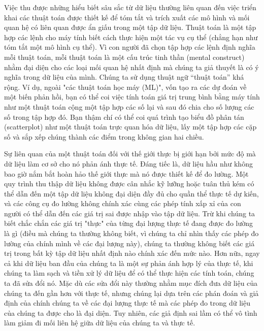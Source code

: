 Việc thu được những hiểu biết sâu sắc từ dữ liệu thường liên quan đến việc triển khai các thuật toán được thiết kế để tóm tắt và trích xuất các mô hình và mối quan hệ có liên quan được ẩn giấu trong một tập dữ liệu. Thuật toán là một tập hợp các lệnh cho máy tính biết cách thực hiện một tác vụ cụ thể (chẳng hạn như tóm tắt một mô hình cụ thể). Vì con người đã chọn tập hợp các lệnh định nghĩa mỗi thuật toán, mỗi thuật toán là một cấu trúc tinh thần (mental construct) nhằm đại diện cho các loại mối quan hệ nhất định mà chúng ta giả thuyết là có ý nghĩa trong dữ liệu của mình. Chúng ta sử dụng thuật ngữ “thuật toán” khá rộng. Ví dụ, ngoài "các thuật toán học máy (ML)", vốn tạo ra các dự đoán về một biến phản hồi, bạn có thể coi việc tính toán giá trị trung bình bằng máy tính như một thuật toán cộng một tập hợp các số lại và sau đó chia cho số lượng các số trong tập hợp đó. Bạn thậm chí có thể coi quá trình tạo biểu đồ phân tán (scatterplot) như một thuật toán trực quan hóa dữ liệu, lấy một tập hợp các cặp số và sắp xếp chúng thành các điểm trong không gian hai chiều.

Sự liên quan của một thuật toán đối với thế giới thực bị giới hạn bởi mức độ mà dữ liệu làm cơ sở cho nó phản ánh thực tế. Đáng tiếc là, dữ liệu hầu như không bao giờ nắm bắt hoàn hảo thế giới thực mà nó được thiết kế để đo lường. Một quy trình thu thập dữ liệu không được cân nhắc kỹ lưỡng hoặc tuân thủ kém có thể dẫn đến một tập dữ liệu không đại diện đầy đủ cho quần thể thực tế dự kiến, và các công cụ đo lường không chính xác cùng các phép tính xấp xỉ của con người có thể dẫn đến các giá trị sai được nhập vào tập dữ liệu. Trừ khi chúng ta biết chắc chắn các giá trị "thực" của từng đại lượng thực tế đang được đo lường là gì (điều mà chúng ta thường không biết, vì chúng ta chỉ nhìn thấy các phép đo lường của chính mình về các đại lượng này), chúng ta thường không biết các giá trị trong bất kỳ tập dữ liệu nhất định nào chính xác đến mức nào. Hơn nữa, ngay cả khi dữ liệu ban đầu của chúng ta là một sự phản ánh hợp lý của thực tế, khi chúng ta làm sạch và tiền xử lý dữ liệu để có thể thực hiện các tính toán, chúng ta đã sửa đổi nó. Mặc dù các sửa đổi này thường nhằm mục đích đưa dữ liệu của chúng ta đến gần hơn với thực tế, nhưng chúng lại dựa trên các phán đoán và giả định của chính chúng ta về các đại lượng thực tế mà các phép đo trong dữ liệu của chúng ta được cho là đại diện. Tuy nhiên, các giả định sai lầm có thể vô tình làm giảm đi mối liên hệ giữa dữ liệu của chúng ta và thực tế.

